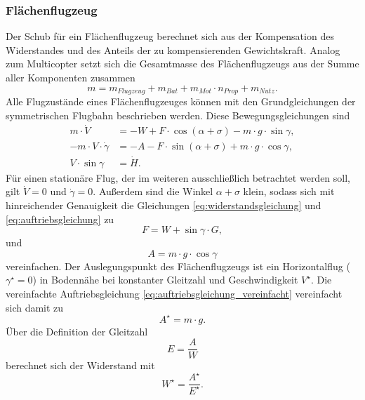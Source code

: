 \subsubsection{Flächenflugzeug}
Der Schub für ein Flächenflugzeug berechnet sich aus der Kompensation des Widerstandes und des Anteils der zu kompensierenden Gewichtskraft. Analog zum Multicopter setzt sich die Gesamtmasse des Flächenflugzeugs aus der Summe aller Komponenten zusammen
\begin{equation}
	m = m_{Flugzeug}+m_{Bat}+m_{Mot}\cdot n_{Prop}+m_{Nutz}.
\end{equation}
Alle Flugzustände eines Flächenflugzeuges können mit den Grundgleichungen der symmetrischen Flugbahn beschrieben werden. Diese Bewegungsgleichungen \cite[S.77]{Bruning.1986} sind
\begin{align}
	m\cdot \dot{V} &= -W + F\cdot\cos(\alpha+\sigma)-m\cdot g\cdot\sin\gamma , \label{eq:widerstandsgleichung} \\ 
	-m\cdot V\cdot\dot{\gamma} &= -A - F\cdot\sin(\alpha+\sigma)+m\cdot g\cdot\cos\gamma , \label{eq:auftriebsgleichung} \\ 
	V\cdot\sin\gamma &= \dot{H}. \label{eq:steiggleichung}
\end{align}	
Für einen stationäre Flug, der im weiteren ausschließlich betrachtet werden soll, gilt \ensuremath{\dot{V} = 0} und \ensuremath{\dot{\gamma} = 0}. Außerdem sind die Winkel \ensuremath{\alpha + \sigma} klein, sodass sich mit hinreichender Genauigkeit die Gleichungen \ref{eq:widerstandsgleichung} und \ref{eq:auftriebsgleichung} zu
\begin{equation}
	F = W + \sin\gamma\cdot G, \label{eq:widerstandsgleichung_vereinfacht}
\end{equation}
und
\begin{equation}
	A = m\cdot g\cdot\cos\gamma 
\end{equation} \label{eq:auftriebsgleichung_vereinfacht}
vereinfachen. Der Auslegungspunkt des Flächenflugzeugs ist ein Horizontalflug (\ensuremath{\gamma^\star = 0}) in Bodennähe bei konstanter Gleitzahl und Geschwindigkeit \ensuremath{V^\star}. Die vereinfachte Auftriebsgleichung \ref{eq:auftriebsgleichung_vereinfacht} vereinfacht sich damit zu
\begin{equation}
	A^\star = m\cdot g .
\end{equation}
Über die Definition der Gleitzahl 
\begin{equation}
	E = \frac{A}{W}
\end{equation}
berechnet sich der Widerstand mit
\begin{equation}
	W^\star = \frac{A^\star}{E^\star} .
\end{equation}
